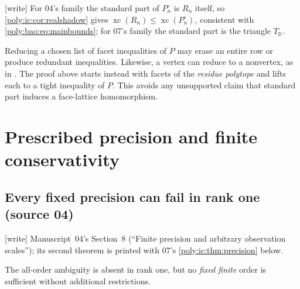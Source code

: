 \documentclass[11pt,a4paper]{article}
\numberwithin{equation}{section}
\theoremstyle{plain}
\newcommand{\wtag}{\textup{[write]}}%
\newcommand{\R}{\mathbb R}
\newcommand{\xc}{\operatorname{xc}}
\begin{document}
\wtag{} For 04's family the standard part of $P^\circ_n$ is $R_n$ itself,
so \cref{poly:ic:cor:realshadow} gives $\xc(R_n)\leq\xc(P^\circ_n)$,
consistent with \eqref{poly:bao:eq:mainbounds}; for 07's family the
standard part is the triangle $T_\R$.

\begin{remark}
Reducing a chosen list of facet inequalities of $P$ may erase an entire
row or produce redundant inequalities. Likewise, a vertex can reduce to
a nonvertex, as in . The proof above starts instead with
facets of the \emph{residue polytope} and lifts each to a tight inequality
of $P$. This avoids any unsupported claim that standard part induces a
face-lattice homomorphism.
\end{remark}

\section{Prescribed precision and finite conservativity}\label{poly:ic:sec:precision}

\subsection{Every fixed precision can fail in rank one (source 04)}\label{poly:bao:sec:scales}
\wtag{} Manuscript~04's Section~8 (``Finite precision and arbitrary
observation scales''); its second theorem is printed with 07's
\cref{poly:ic:thm:precision} below.

The all-order ambiguity is absent in rank one, but no \emph{fixed finite}
order is sufficient without additional restrictions.
\end{document}
